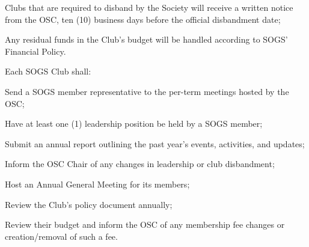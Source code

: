 \begin{longenum}[ label*=\thesubsection.\arabic*., align=left]
\begin{longenum}[label*=\arabic*., align=left]
	\item Clubs that are required to disband by the Society will receive a written notice from the OSC, ten (10) business days before the official disbandment date;
	\item Any residual funds in the Club's budget will be handled according to SOGS' Financial Policy.
	\end{longenum}
\item Each SOGS Club shall:
	\begin{longenum}[label*=\arabic*., align=left]
	\item Send a SOGS member representative to the per-term meetings hosted by the OSC;
	\item Have at least one (1) leadership position be held by a SOGS member;
	\item Submit an annual report outlining the past year's events, activities, and updates;
	\item Inform the OSC Chair of any changes in leadership or club disbandment;
	\item Host an Annual General Meeting for its members;
	\item Review the Club's policy document annually;		
	\item Review their budget and inform the OSC of any membership fee changes or creation/removal of such a fee.
	\end{longenum}
\end{longenum}

